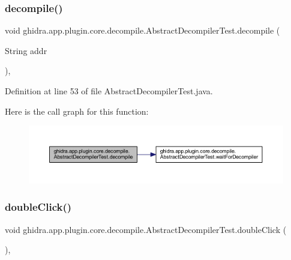 \subsubsection{\texorpdfstring{decompile()}{decompile()}\hspace{0.1cm}{\footnotesize\ttfamily [2/2]}}
{\footnotesize\ttfamily void ghidra.\+app.\+plugin.\+core.\+decompile.\+Abstract\+Decompiler\+Test.\+decompile (\begin{DoxyParamCaption}\item[{String}]{addr }\end{DoxyParamCaption})\hspace{0.3cm}{\ttfamily [inline]}, {\ttfamily [protected]}}



Definition at line 53 of file Abstract\+Decompiler\+Test.\+java.

Here is the call graph for this function\+:
\nopagebreak
\begin{figure}[H]
\begin{center}
\leavevmode
\includegraphics[width=350pt]{classghidra_1_1app_1_1plugin_1_1core_1_1decompile_1_1_abstract_decompiler_test_a3cf71446efa71e0a76b812ebffa38080_cgraph}
\end{center}
\end{figure}
\mbox{\label{classghidra_1_1app_1_1plugin_1_1core_1_1decompile_1_1_abstract_decompiler_test_a1063d5440b4632c1589366050d8395b5}} 
\subsubsection{\texorpdfstring{doubleClick()}{doubleClick()}}
{\footnotesize\ttfamily void ghidra.\+app.\+plugin.\+core.\+decompile.\+Abstract\+Decompiler\+Test.\+double\+Click (\begin{DoxyParamCaption}{ }\end{DoxyParamCaption})\hspace{0.3cm}{\ttfamily [inline]}, {\ttfamily [protected]}}



